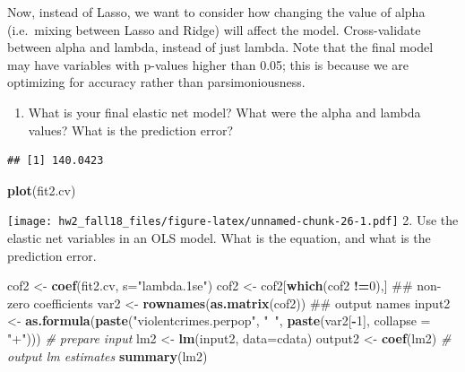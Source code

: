\documentclass[]{article}
\newenvironment{Shaded}{\begin{snugshade}}{\end{snugshade}}
\newcommand{\KeywordTok}[1]{\textcolor[rgb]{0.13,0.29,0.53}{\textbf{#1}}}
\newcommand{\DataTypeTok}[1]{\textcolor[rgb]{0.13,0.29,0.53}{#1}}
\newcommand{\DecValTok}[1]{\textcolor[rgb]{0.00,0.00,0.81}{#1}}
\newcommand{\StringTok}[1]{\textcolor[rgb]{0.31,0.60,0.02}{#1}}
\newcommand{\CommentTok}[1]{\textcolor[rgb]{0.56,0.35,0.01}{\textit{#1}}}
\newcommand{\OperatorTok}[1]{\textcolor[rgb]{0.81,0.36,0.00}{\textbf{#1}}}
\newcommand{\NormalTok}[1]{#1}
\providecommand{\tightlist}{%
  \setlength{\itemsep}{0pt}\setlength{\parskip}{0pt}}
\begin{document}
Now, instead of Lasso, we want to consider how changing the value of
alpha (i.e.~mixing between Lasso and Ridge) will affect the model.
Cross-validate between alpha and lambda, instead of just lambda. Note
that the final model may have variables with p-values higher than 0.05;
this is because we are optimizing for accuracy rather than
parsimoniousness.

\begin{enumerate}
\def\labelenumi{\arabic{enumi}.}
\tightlist
\item
  What is your final elastic net model? What were the alpha and lambda
  values? What is the prediction error?
\end{enumerate}

\begin{Shaded}
\end{Shaded}

\begin{verbatim}
## [1] 140.0423
\end{verbatim}

\begin{Shaded}
\begin{Highlighting}[]
\KeywordTok{plot}\NormalTok{(fit2.cv)}
\end{Highlighting}
\end{Shaded}

\texttt{[image: hw2\_fall18\_files/figure-latex/unnamed-chunk-26-1.pdf]}
2. Use the elastic net variables in an OLS model. What is the equation,
and what is the prediction error.

\begin{Shaded}
\begin{Highlighting}[]
\NormalTok{cof2 <-}\StringTok{ }\KeywordTok{coef}\NormalTok{(fit2.cv, }\DataTypeTok{s=}\StringTok{"lambda.1se"}\NormalTok{) }
\NormalTok{cof2 <-}\StringTok{ }\NormalTok{cof2[}\KeywordTok{which}\NormalTok{(cof2 }\OperatorTok{!=}\DecValTok{0}\NormalTok{),] ##  non-zero coefficients}
\NormalTok{var2 <-}\StringTok{ }\KeywordTok{rownames}\NormalTok{(}\KeywordTok{as.matrix}\NormalTok{(cof2)) ## output names}
\NormalTok{input2 <-}\StringTok{ }\KeywordTok{as.formula}\NormalTok{(}\KeywordTok{paste}\NormalTok{(}\StringTok{"violentcrimes.perpop"}\NormalTok{, }\StringTok{"~"}\NormalTok{, }\KeywordTok{paste}\NormalTok{(var2[}\OperatorTok{-}\DecValTok{1}\NormalTok{], }\DataTypeTok{collapse =} \StringTok{"+"}\NormalTok{))) }\CommentTok{# prepare input}
\NormalTok{lm2 <-}\StringTok{ }\KeywordTok{lm}\NormalTok{(input2, }\DataTypeTok{data=}\NormalTok{cdata)}
\NormalTok{output2 <-}\StringTok{ }\KeywordTok{coef}\NormalTok{(lm2) }\CommentTok{# output lm estimates}
\KeywordTok{summary}\NormalTok{(lm2)}
\end{Highlighting}
\end{Shaded}
\end{document}
